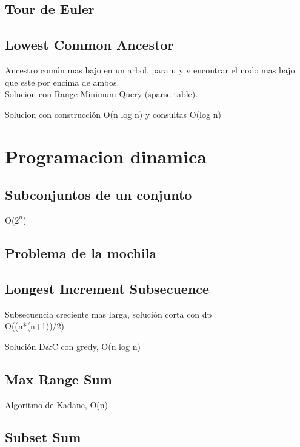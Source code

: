 \documentclass[10pt,landscape,twocolumn,a4paper,notitlepage]{article}
\newcommand\cppfile[2][]{

}
\begin{document}
			\subsection{Tour de Euler}
			\cppfile[10-33]{grafos/tour_euleriano.cpp}
			\subsection{Lowest Common Ancestor}
			Ancestro común mas bajo en un arbol, para u y v encontrar el nodo mas bajo que este por encima de
			ambos.\\
			Solucion con Range Minimum Query (sparse table).
			\cppfile[38-65]{otros/Lowest_Common_Ancestor.cpp}
			Solucion con construcción O(n log n) y consultas O(log n)
			\cppfile[14-51]{otros/Lowest_Common_Ancestor_logN.cpp}
			
		\section{Programacion dinamica}
			\subsection{Subconjuntos de un conjunto}
			O($2^{n}$)
			\cppfile[6-15]{programacion_dinamica/bitmask.cpp}
			\subsection{Problema de la mochila}
			\cppfile[8-23]{programacion_dinamica/knapsack.cpp}
			\subsection{Longest Increment Subsecuence}
			Subsecuencia creciente mas larga, solución corta con dp\\
			O((n*(n+1))/2)
			\cppfile[48-57]{programacion_dinamica/longest_increasing_subsequence.cpp}
			Solución D{\&}C con gredy, O(n log n)
			\cppfile[7-46]{programacion_dinamica/longest_increasing_subsequence.cpp}
			\subsection{Max Range Sum}
			Algoritmo de Kadane, O(n)
			\cppfile[6-22]{programacion_dinamica/Max_Range_Sum.cpp}
			\subsection{Subset Sum}
			\cppfile[8-20]{programacion_dinamica/Subset_Sum.cpp}
\end{document}
